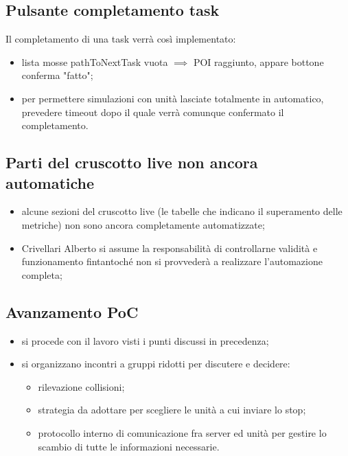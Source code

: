 \subsection{Pulsante completamento task}
    Il completamento di una task verrà così implementato:
    \begin{itemize}
        \item lista mosse pathToNextTask vuota $\implies$ POI raggiunto, appare bottone conferma "fatto";
        \item per permettere simulazioni con unità lasciate totalmente in automatico, prevedere timeout dopo il quale verrà comunque confermato il completamento.
    \end{itemize}

\subsection{Parti del cruscotto live non ancora automatiche}
    \begin{itemize}
        \item alcune sezioni del cruscotto live (le tabelle che indicano il superamento delle metriche) non sono ancora completamente automatizzate;
        \item Crivellari Alberto si assume la responsabilità di controllarne validità e funzionamento fintantoché non si provvederà a realizzare l'automazione completa;
    \end{itemize}

\subsection{Avanzamento PoC}
\label{poc}
    \begin{itemize}
        \item si procede con il lavoro visti i punti discussi in precedenza;
        \item si organizzano incontri a gruppi ridotti per discutere e decidere:
        \begin{itemize}
            \item rilevazione collisioni;
            \item strategia da adottare per scegliere le unità a cui inviare lo stop;
            \item protocollo interno di comunicazione fra server ed unità per gestire lo scambio di tutte le informazioni necessarie.
        \end{itemize}
    \end{itemize}









